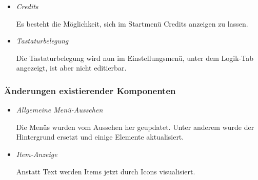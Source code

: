 \begin{itemize}
\begin{leftbar}[0.9\linewidth]
        \end{leftbar}
    \item \textit{Credits}
        \begin{leftbar}[0.9\linewidth]
            Es besteht die Möglichkeit, sich im Startmenü Credits 
            anzeigen zu lassen.
        \end{leftbar}
    \item \textit{Tastaturbelegung}
        \begin{leftbar}[0.9\linewidth]
            Die Tastaturbelegung wird nun im Einstellungsmenü, 
            unter dem Logik-Tab angezeigt, ist aber nicht editierbar.
        \end{leftbar}
\end{itemize}

\subsubsection{Änderungen existierender Komponenten}
\begin{itemize}
    \item \textit{Allgemeine Menü-Aussehen}
        \begin{leftbar}[0.9\linewidth]
            Die Menüs wurden vom Aussehen her geupdatet. Unter anderem
            wurde der Hintergrund ersetzt und einige Elemente
            aktualisiert.
        \end{leftbar}
    \item \textit{Item-Anzeige}
        \begin{leftbar}[0.9\linewidth]
            Anstatt Text werden Items jetzt durch Icons visualisiert.
        \end{leftbar}
\end{itemize}

